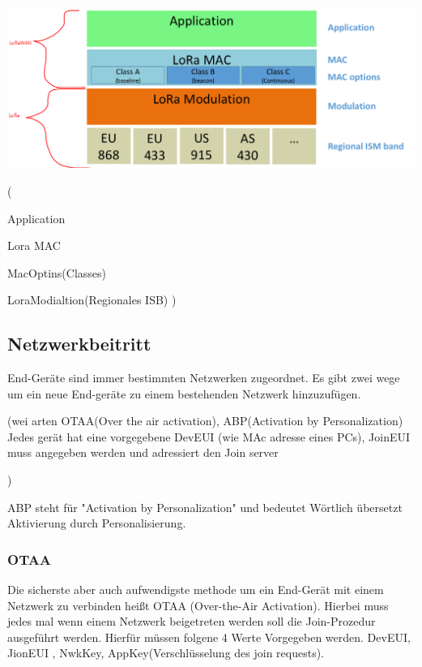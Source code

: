 \documentclass[a4paper,12pt]{article}
\begin{document}
            \includegraphics[width=\textwidth]{LoraLayer}

            \cite{WhatIsLoRa}(

            Application

            Lora MAC

            MacOptins(Classes)

            LoraModialtion(Regionales ISB)
            )
            

        \subsection{Netzwerkbeitritt}
            End-Geräte sind immer bestimmten Netzwerken zugeordnet. Es gibt zwei wege um ein neue End-geräte zu einem bestehenden Netzwerk hinzuzufügen.

            \cite{LoRaSpec}(wei arten OTAA(Over the air activation), ABP(Activation by Personalization)
                    Jedes gerät hat eine vorgegebene DevEUI (wie MAc adresse eines PCs), JoinEUI muss angegeben werden und adressiert den Join server 
                    
            )
            
            
                ABP steht für "Activation by Personalization" und bedeutet Wörtlich übersetzt Aktivierung durch Personalisierung. 

            
            \subsubsection{OTAA}
            Die sicherste aber auch aufwendigste methode um ein End-Gerät mit einem Netzwerk zu verbinden heißt OTAA (Over-the-Air Activation). Hierbei muss jedes mal wenn einem Netzwerk beigetreten werden soll die Join-Prozedur ausgeführt werden.
            Hierfür müssen folgene 4 Werte Vorgegeben werden. DevEUI, JionEUI , NwkKey, AppKey(Verschlüsselung des join requests).
\end{document}
